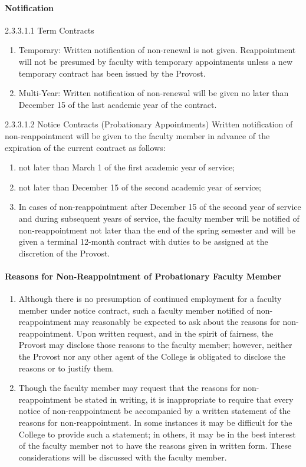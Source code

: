 \documentclass[letterpaper, 11pt]{article}
\begin{document}
			\paragraph{Notification}
				2.3.3.1.1 Term Contracts
				\begin{enumerate}[label=\alph*)]
					\item{Temporary: Written notification of non-renewal is not given.  Reappointment will not be presumed by faculty with temporary appointments unless a new temporary contract has been issued by the Provost.}
					\item{Multi-Year: Written notification of non-renewal will be given no later than December 15 of the last academic year of the contract.}
				\end{enumerate}
				2.3.3.1.2 Notice Contracts (Probationary Appointments)
				Written notification of non-reappointment will be given to the faculty member in advance of the expiration of the current contract as follows:
				\begin{enumerate}[label=\alph*)]
					\item{not later than March 1 of the first academic year of service;}
					\item{not later than December 15 of the second academic year of service;}
					\item{In cases of non-reappointment after December 15 of the second year of service and during subsequent years of service, the faculty member will be notified of non-reappointment not later than the end of the spring semester and will be given a terminal 12-month contract with duties to be assigned at the discretion of the Provost.}
				\end{enumerate}
			\paragraph{Reasons for Non-Reappointment of Probationary Faculty Member}
				\begin{enumerate}[label=\alph*)]
					\item{Although there is no presumption of continued employment for a faculty member under notice contract, such a faculty member notified of non-reappointment may reasonably be expected to ask about the reasons for non-reappointment.  Upon written request, and in the spirit of fairness, the Provost may disclose those reasons to the faculty member; however, neither the Provost nor any other agent of the College is obligated to disclose the reasons or to justify them.}
					\item{Though the faculty member may request that the reasons for non-reappointment be stated in writing, it is inappropriate to require that every notice of non-reappointment be accompanied by a written statement of the reasons for non-reappointment.  In some instances it may be difficult for the College to provide such a statement; in others, it may be in the best interest of the faculty member not to have the reasons given in written form.  These considerations will be discussed with the faculty member.}
				\end{enumerate}
\end{document}
